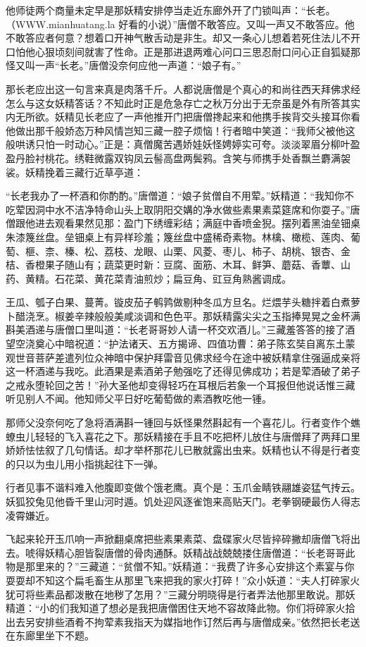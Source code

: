 \documentclass[12pt,UTF8]{ctexbook}
\begin{document}
{	他师徒两个商量未定早是那妖精安排停当走近东廊外开了门锁叫声：“长老。（WWW.mianhuatang.la 好看的小说）”唐僧不敢答应。又叫一声又不敢答应。他不敢答应者何意？想着口开神气散舌动是非生。却又一条心儿想着若死住法儿不开口怕他心狠顷刻间就害了性命。正是那进退两难心问口三思忍耐口问心正自狐疑那怪又叫一声“长老。”唐僧没奈何应他一声道：“娘子有。”
	
	那长老应出这一句言来真是肉落千斤。人都说唐僧是个真心的和尚往西天拜佛求经怎么与这女妖精答话？不知此时正是危急存亡之秋万分出于无奈虽是外有所答其实内无所欲。妖精见长老应了一声他推开门把唐僧搀起来和他携手挨背交头接耳你看他做出那千般娇态万种风情岂知三藏一腔子烦恼！行者暗中笑道：“我师父被他这般哄诱只怕一时动心。”正是：真僧魔苦遇娇娃妖怪娉婷实可夸。淡淡翠眉分柳叶盈盈丹脸衬桃花。绣鞋微露双钩凤云髻高盘两鬓鸦。含笑与师携手处香飘兰麝满袈裟。妖精挽着三藏行近草亭道：
	
	“长老我办了一杯酒和你酌酌。”唐僧道：“娘子贫僧自不用荤。”妖精道：“我知你不吃荤因洞中水不洁净特命山头上取阴阳交媾的净水做些素果素菜筵席和你耍子。”唐僧跟他进去观看果然见那：盈门下绣缠彩结；满庭中香喷金猊。摆列着黑油垒钿桌朱漆篾丝盘。垒钿桌上有异样珍羞；篾丝盘中盛稀奇素物。林檎、橄榄、莲肉、葡萄、榧、柰、榛、松、荔枝、龙眼、山栗、风菱、枣儿、柿子、胡桃、银杏、金桔、香橙果子随山有；蔬菜更时新：豆腐、面筋、木耳、鲜笋、蘑菇、香蕈、山药、黄精。石花菜、黄花菜青油煎炒；扁豆角、豇豆角熟酱调成。
	
	王瓜、瓠子白果、蔓菁。镟皮茄子鹌鹑做剔种冬瓜方旦名。烂煨芋头糖拌着白煮萝卜醋浇烹。椒姜辛辣般般美咸淡调和色色平。那妖精露尖尖之玉指捧晃晃之金杯满斟美酒递与唐僧口里叫道：“长老哥哥妙人请一杯交欢酒儿。”三藏羞答答的接了酒望空浇奠心中暗祝道：“护法诸天、五方揭谛、四值功曹：弟子陈玄奘自离东土蒙观世音菩萨差遣列位众神暗中保护拜雷音见佛求经今在途中被妖精拿住强逼成亲将这一杯酒递与我吃。此酒果是素酒弟子勉强吃了还得见佛成功；若是荤酒破了弟子之戒永堕轮回之苦！”孙大圣他却变得轻巧在耳根后若象一个耳报但他说话惟三藏听见别人不闻。他知师父平日好吃葡萄做的素酒教吃他一锺。
	
	那师父没奈何吃了急将酒满斟一锺回与妖怪果然斟起有一个喜花儿。行者变作个蟭蟟虫儿轻轻的飞入喜花之下。那妖精接在手且不吃把杯儿放住与唐僧拜了两拜口里娇娇怯怯叙了几句情话。却才举杯那花儿已散就露出虫来。妖精也认不得是行者变的只以为虫儿用小指挑起往下一弹。
	
	行者见事不谐料难入他腹即变做个饿老鹰。真个是：玉爪金睛铁翮雄姿猛气抟云。妖狐狡兔见他昏千里山河时遁。饥处迎风逐雀饱来高贴天门。老拳钢硬最伤人得志凌霄嫌近。
	
	飞起来轮开玉爪响一声掀翻桌席把些素果素菜、盘碟家火尽皆捽碎撇却唐僧飞将出去。唬得妖精心胆皆裂唐僧的骨肉通酥。妖精战战兢兢搂住唐僧道：“长老哥哥此物是那里来的？”三藏道：“贫僧不知。”妖精道：“我费了许多心安排这个素宴与你耍耍却不知这个扁毛畜生从那里飞来把我的家火打碎！”众小妖道：“夫人打碎家火犹可将些素品都泼散在地秽了怎用？”三藏分明晓得是行者弄法他那里敢说。那妖精道：“小的们我知道了想必是我把唐僧困住天地不容故降此物。你们将碎家火拾出去另安排些酒肴不拘荤素我指天为媒指地作订然后再与唐僧成亲。”依然把长老送在东廊里坐下不题。
	
}
\end{document}
